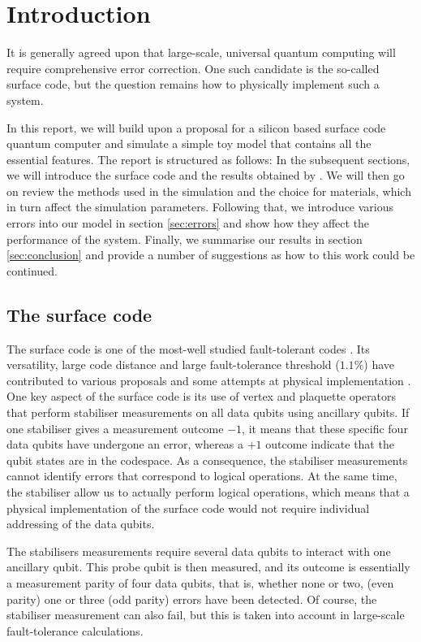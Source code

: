 
\section{Introduction} \label{sec:Introduction}

It is generally agreed upon that large-scale, universal quantum computing will require comprehensive error correction. One such candidate is the so-called surface code, but the question remains how to physically implement such a system. 

In this report, we will build upon a proposal for a silicon based surface code quantum computer \cite{OGorman2016} and simulate a simple toy model that contains all the essential features. 
The report is structured as follows: In the subsequent sections, we will introduce the surface code and the results obtained by \citet{OGorman2016}. We will then go on review the methods used in the simulation and the choice for materials, which in turn affect the simulation parameters. Following that, we introduce various errors into our model in section \ref{sec:errors} and show how they affect the performance of the system. Finally, we summarise our results in section \ref{sec:conclusion} and provide a number of suggestions as how to this work could be continued. 

\subsection{The surface code}
The surface code is one of the most-well studied fault-tolerant codes \cite{Wang2011,Fowler2012}. Its versatility, large code distance and large fault-tolerance threshold ($1.1\%$) have contributed to various proposals \cite{Fowler2012,Pica2014,Tosi2015,Hill2015,OGorman2016} and some attempts at physical implementation \cite{Barends2014,Kelly2015}. One key aspect of the surface code is its use of vertex and plaquette operators that perform stabiliser measurements on all data qubits using ancillary qubits. If one stabiliser gives a measurement outcome $-1$, it means that these specific four data qubits have undergone an error, whereas a $+1$ outcome indicate that the qubit states are in the codespace. As a consequence, the stabiliser measurements cannot identify errors that correspond to logical operations. At the same time, the stabiliser allow us to actually perform logical operations, which means that a physical implementation of the surface code would not require individual addressing of the data qubits. 

The stabilisers measurements require several data qubits to interact with one ancillary qubit. This probe qubit is then measured, and its outcome is essentially  a measurement parity of four data qubits, that is, whether none or two,  (even parity) one  or three (odd parity) errors have been detected. Of course, the stabiliser measurement can also fail, but this is taken into account in large-scale fault-tolerance calculations. 





